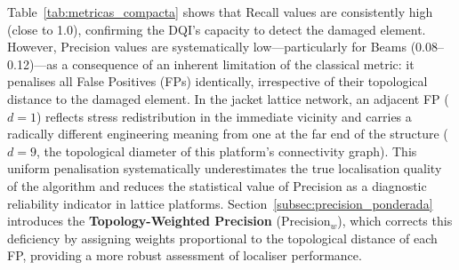 \documentclass[a4paper,fleqn,nologo]{cas-dc}
\begin{document}
Table~\ref{tab:metricas_compacta} shows that Recall values are consistently high (close to 1.0),
confirming the DQI's capacity to detect the damaged element. However, Precision values are
systematically low---particularly for Beams (0.08--0.12)---as a consequence of an inherent
limitation of the classical metric: it penalises all False Positives (FPs) identically,
irrespective of their topological distance to the damaged element. In the jacket lattice
network, an adjacent FP ($d=1$) reflects stress redistribution in the immediate vicinity and
carries a radically different engineering meaning from one at the far end of the structure
($d=9$, the topological diameter of this platform's connectivity graph). This uniform penalisation systematically underestimates the true localisation quality
of the algorithm and reduces the statistical value of Precision as a diagnostic reliability
indicator in lattice platforms. Section~\ref{subsec:precision_ponderada} introduces the
\textbf{Topology-Weighted Precision} ($\text{Precision}_w$), which corrects this deficiency
by assigning weights proportional to the topological distance of each FP, providing a more
robust assessment of localiser performance.
\end{document}
